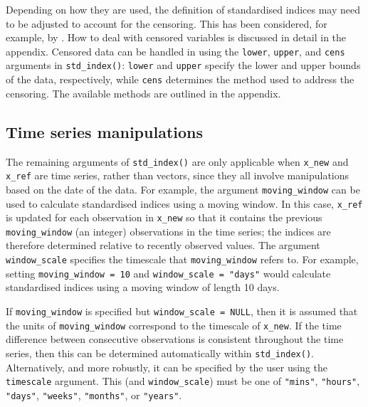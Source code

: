 Depending on how they are used, the definition of standardised indices may need to be adjusted to account for the censoring. This has been considered, for example, by \cite{StaggeEtAl2015}. How to deal with censored variables is discussed in detail in the appendix. Censored data can be handled in  using the \texttt{lower}, \texttt{upper}, and \texttt{cens} arguments in \texttt{std\_index()}: \texttt{lower} and \texttt{upper} specify the lower and upper bounds of the data, respectively, while \texttt{cens} determines the method used to address the censoring. The available methods are outlined in the appendix.

\hypertarget{time-series-manipulations}{%
\subsection{Time series manipulations}\label{time-series-manipulations}}

The remaining arguments of \texttt{std\_index()} are only applicable when \texttt{x\_new} and \texttt{x\_ref} are time series, rather than vectors, since they all involve manipulations based on the date of the data. For example, the argument \texttt{moving\_window} can be used to calculate standardised indices using a moving window. In this case, \texttt{x\_ref} is updated for each observation in \texttt{x\_new} so that it contains the previous \texttt{moving\_window} (an integer) observations in the time series; the indices are therefore determined relative to recently observed values. The argument \texttt{window\_scale} specifies the timescale that \texttt{moving\_window} refers to. For example, setting \texttt{moving\_window\ =\ 10} and \texttt{window\_scale\ =\ "days"} would calculate standardised indices using a moving window of length 10 days.

If \texttt{moving\_window} is specified but \texttt{window\_scale\ =\ NULL}, then it is assumed that the units of \texttt{moving\_window} correspond to the timescale of \texttt{x\_new}. If the time difference between consecutive observations is consistent throughout the time series, then this can be determined automatically within \texttt{std\_index()}. Alternatively, and more robustly, it can be specified by the user using the \texttt{timescale} argument. This (and \texttt{window\_scale}) must be one of \texttt{"mins"}, \texttt{"hours"}, \texttt{"days"}, \texttt{"weeks"}, \texttt{"months"}, or \texttt{"years"}.

